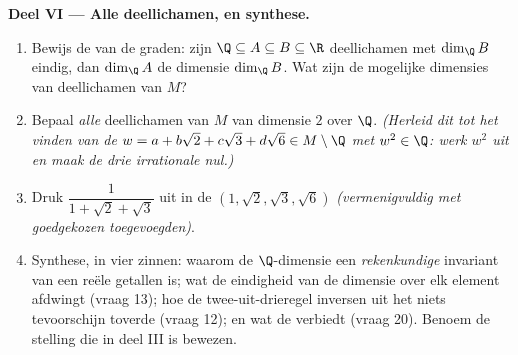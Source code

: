 \begin{problem}
\medskip
\noindent\textbf{Deel VI --- Alle deellichamen, en synthese.}
\begin{enumerate}[resume]
  \item Bewijs de  van de graden: zijn $\Q \subseteq A
        \subseteq B \subseteq \R$ deellichamen met $\dim_\Q B$
        eindig, dan  $\dim_\Q A$ de dimensie $\dim_\Q B$. Wat
        zijn de mogelijke dimensies van deellichamen van $M$?
  \item Bepaal \emph{alle} deellichamen van $M$ van dimensie $2$
        over $\Q$. \emph{(Herleid dit tot het vinden van de $w = a
        + b\sqrt2 + c\sqrt3 + d\sqrt6 \in M \setminus \Q$ met $w^2
        \in \Q$: werk $w^2$ uit en maak de drie irrationale
         nul.)}
  \item Druk $\dfrac1{1 + \sqrt2 + \sqrt3}$ uit in de  $(1,
        \sqrt2, \sqrt3, \sqrt6)$ \emph{(vermenigvuldig met
        goedgekozen toegevoegden)}.
  \item Synthese, in vier zinnen: waarom de $\Q$-dimensie een
        \emph{rekenkundige} invariant van een  reële
        getallen is; wat de eindigheid van de dimensie over elk
        element afdwingt (vraag 13); hoe de twee-uit-drieregel
        inversen uit het niets tevoorschijn toverde (vraag 12); en
        wat de  verbiedt (vraag 20). Benoem de stelling die
        in deel III is bewezen.
\end{enumerate}
\end{problem}
